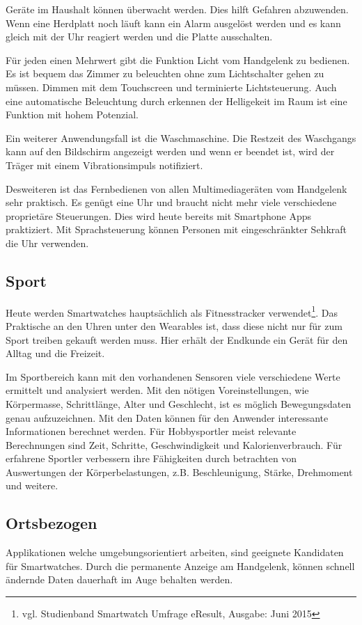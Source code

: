 Geräte im Haushalt können überwacht werden. Dies hilft Gefahren abzuwenden. Wenn eine Herdplatt noch läuft kann ein Alarm ausgelöst werden und es kann gleich mit der Uhr reagiert werden und die Platte ausschalten.

Für jeden einen Mehrwert gibt die Funktion Licht vom Handgelenk zu bedienen. Es ist bequem das Zimmer zu beleuchten ohne zum Lichtschalter gehen zu müssen. Dimmen mit dem Touchscreen und terminierte Lichtsteuerung. Auch eine automatische Beleuchtung durch erkennen der Helligekeit im Raum ist eine Funktion mit hohem Potenzial.

Ein weiterer Anwendungsfall ist die Waschmaschine. Die Restzeit des Waschgangs kann auf den Bildschirm angezeigt werden und wenn er beendet ist, wird der Träger mit einem Vibrationsimpuls notifiziert.

Desweiteren ist das Fernbedienen von allen Multimediageräten vom Handgelenk sehr praktisch. Es genügt eine Uhr und braucht nicht mehr viele verschiedene proprietäre Steuerungen. Dies wird heute bereits mit Smartphone Apps praktiziert. Mit Sprachsteuerung können Personen mit eingeschränkter Sehkraft die Uhr verwenden.

\subsection{Sport}
Heute werden Smartwatches hauptsächlich als Fitnesstracker verwendet\footnote{vgl. Studienband Smartwatch Umfrage eResult, Ausgabe: Juni 2015}. Das Praktische an den Uhren unter den Wearables ist, dass diese nicht nur für zum Sport treiben gekauft werden muss. Hier erhält der Endkunde ein Gerät für den Alltag und die Freizeit.

Im Sportbereich kann mit den vorhandenen Sensoren viele verschiedene Werte ermittelt und analysiert werden. Mit den nötigen Voreinstellungen, wie Körpermasse, Schrittlänge, Alter und Geschlecht, ist es möglich Bewegungsdaten genau aufzuzeichnen. Mit den Daten können für den Anwender interessante Informationen berechnet werden. Für Hobbysportler meist relevante Berechnungen sind Zeit, Schritte, Geschwindigkeit und Kalorienverbrauch. Für erfahrene Sportler verbessern ihre Fähigkeiten durch betrachten von Auswertungen der Körperbelastungen, z.B. Beschleunigung, Stärke, Drehmoment und weitere.

\subsection{Ortsbezogen}
Applikationen welche umgebungsorientiert arbeiten, sind geeignete Kandidaten für Smartwatches. Durch die permanente Anzeige am Handgelenk, können schnell ändernde Daten dauerhaft im Auge behalten werden.


